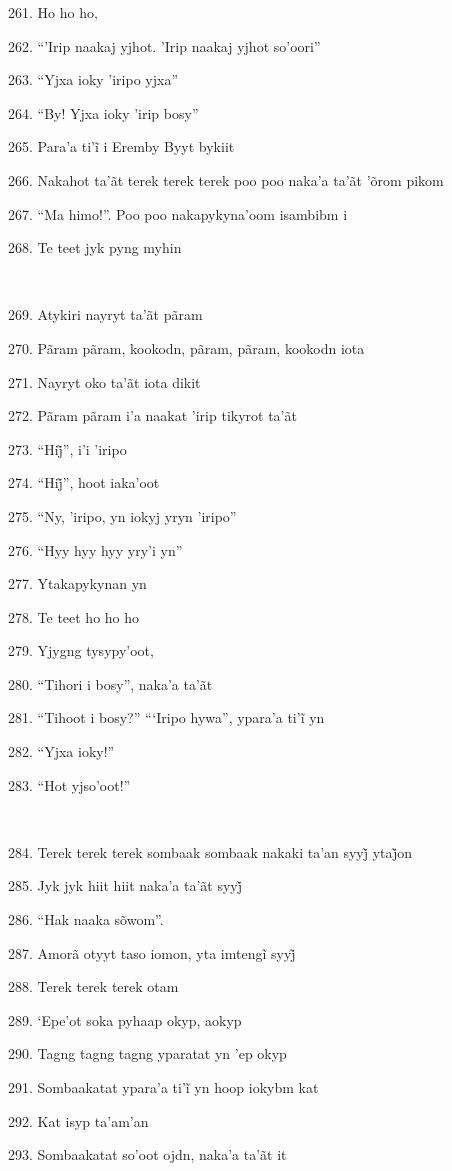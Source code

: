 261. Ho ho ho,

262. ``'Irip naakaj yjhot. 'Irip naakaj yjhot so'oori''

263. ``Yjxa ioky 'iripo yjxa''

264. ``By! Yjxa ioky 'irip bosy''

265. Para’a ti’ĩ i Eremby Byyt bykiit

266. Nakahot ta'ãt terek terek terek poo poo naka'a ta'ãt 'õrom pikom

267. ``Ma himo!''. Poo poo nakapykyna'oom isambibm i

268. Te teet jyk pyng myhin

~

269. Atykiri nayryt ta'ãt pãram

270. Pãram pãram, kookodn, pãram, pãram, kookodn iota

271. Nayryt oko ta'ãt iota dikit

272. Pãram pãram i'a naakat 'irip tikyrot ta'ãt

273. ``Hij̃'', i’i ’iripo

274. ``Hij̃'', hoot iaka’oot

275. ``Ny, 'iripo, yn iokyj yryn 'iripo''

276. ``Hyy hyy hyy yry'i yn''

277. Ytakapykynan yn

278. Te teet ho ho ho

279. Yjygng tysypy'oot,

280. ``Tihori i bosy'', naka'a ta'ãt

281. ``Tihoot i bosy?'' ``‘Iripo hywa'', ypara’a ti’ĩ yn

282. ``Yjxa ioky!''

283. ``Hot yjso'oot!''

~

284. Terek terek terek sombaak sombaak nakaki ta’an syyj̃ ytaj̃on

285. Jyk jyk hiit hiit naka’a ta’ãt syyj̃

286. ``Hak naaka sõwom''.

287. Amorã otyyt taso iomon, yta imtengĩ syyj̃

288. Terek terek terek otam

289. `Epe'ot soka pyhaap okyp, aokyp

290. Tagng tagng tagng yparatat yn 'ep okyp

291. Sombaakatat ypara’a ti’ĩ yn hoop iokybm kat

292. Kat isyp ta'am'an

293. Sombaakatat so'oot ojdn, naka'a ta'ãt it

